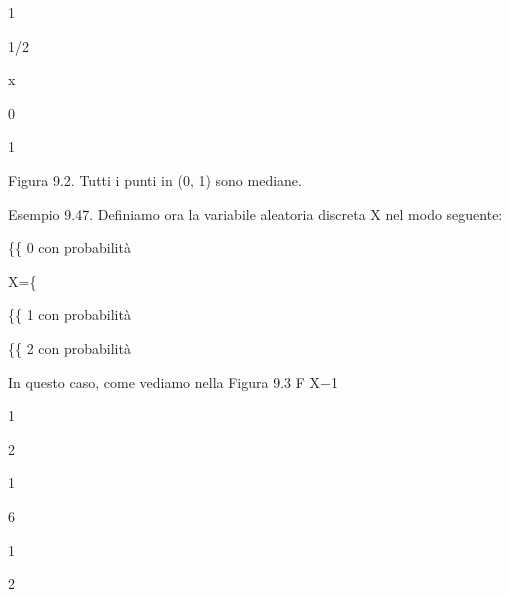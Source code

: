 \documentclass[a4paper,portrait,12pt]{article}
\begin{document}
1





1/2





\begin{flushleft}
x
\end{flushleft}


0





1





\begin{flushleft}
Figura 9.2. Tutti i punti in (0, 1) sono mediane.
\end{flushleft}





\begin{flushleft}
Esempio 9.47. Definiamo ora la variabile aleatoria discreta X nel modo seguente:
\end{flushleft}





\begin{flushleft}
\{\{ 0 con probabilit\`{a}
\end{flushleft}


\begin{flushleft}
X=\{
\end{flushleft}


\begin{flushleft}
\{\{ 1 con probabilit\`{a}
\end{flushleft}


\begin{flushleft}
\{\{ 2 con probabilit\`{a}
\end{flushleft}


\begin{flushleft}
In questo caso, come vediamo nella Figura 9.3 F X$-$1
\end{flushleft}





1


2





1


6


1


2
\end{document}
